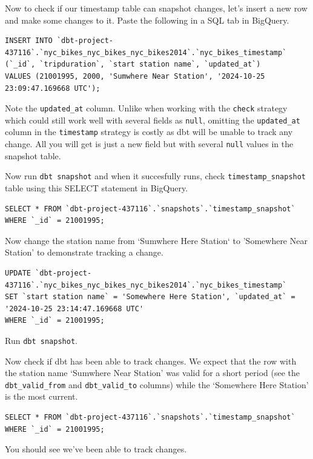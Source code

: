 \documentclass[
]{book}
\begin{document}
Now to check if our timestamp table can snapshot changes, let's insert a new row and make some changes to it. Paste the following in a SQL tab in BigQuery.

\begin{verbatim}
INSERT INTO `dbt-project-437116`.`nyc_bikes_nyc_bikes_nyc_bikes2014`.`nyc_bikes_timestamp` (`_id`, `tripduration`, `start station name`, `updated_at`) 
VALUES (21001995, 2000, 'Sumwhere Near Station', '2024-10-25 23:09:47.169668 UTC');
\end{verbatim}

Note the \texttt{updated\_at} column. Unlike when working with the \texttt{check} strategy which could still work well with several fields as \texttt{null}, omitting the \texttt{updated\_at} column in the \texttt{timestamp} strategy is costly as dbt will be unable to track any change. All you will get is just a new field but with several \texttt{null} values in the snapshot table.

Now run \texttt{dbt\ snapshot} and when it succesfully runs, check \texttt{timestamp\_snapshot} table using this SELECT statement in BigQuery.

\begin{verbatim}
SELECT * FROM `dbt-project-437116`.`snapshots`.`timestamp_snapshot` 
WHERE `_id` = 21001995;
\end{verbatim}

Now change the station name from `Sumwhere Here Station` to 'Somewhere Near Station' to demonstrate tracking a change.

\begin{verbatim}
UPDATE `dbt-project-437116`.`nyc_bikes_nyc_bikes_nyc_bikes2014`.`nyc_bikes_timestamp`
SET `start station name` = 'Somewhere Here Station', `updated_at` = '2024-10-25 23:14:47.169668 UTC'
WHERE `_id` = 21001995;
\end{verbatim}

Run \texttt{dbt\ snapshot}.

Now check if dbt has been able to track changes. We expect that the row with the station name `Sumwhere Near Station' was valid for a short period (see the \texttt{dbt\_valid\_from} and \texttt{dbt\_valid\_to} columns) while the `Somewhere Here Station' is the most current.

\begin{verbatim}
SELECT * FROM `dbt-project-437116`.`snapshots`.`timestamp_snapshot` 
WHERE `_id` = 21001995;
\end{verbatim}

You should see we've been able to track changes.
\end{document}
